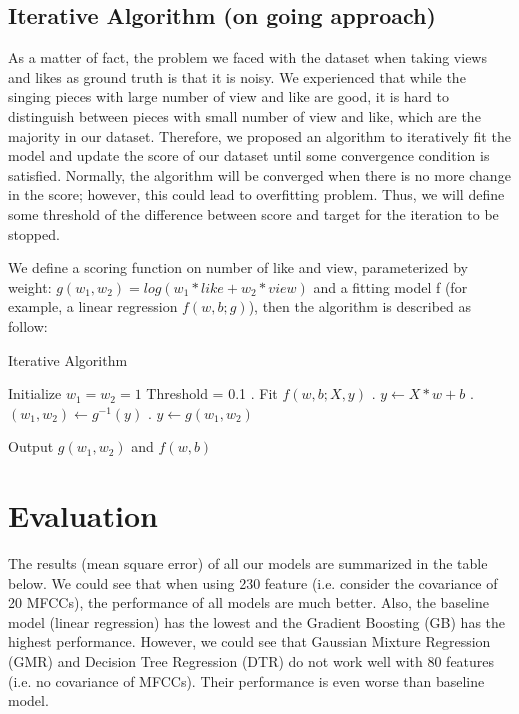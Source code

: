 \documentclass[paper=a4, fontsize=11pt, DIV=13]{scrartcl}
\begin{document}
\subsection{Iterative Algorithm (on going approach)}
As a matter of fact, the problem we faced with the dataset when taking views and likes as ground truth is that it is noisy. We experienced that while the singing pieces with large number of view and like are good, it is hard to distinguish between pieces with small number of view and like, which are the majority in our dataset. Therefore, we proposed an algorithm to iteratively fit the model and update the score of our dataset until some convergence condition is satisfied.  Normally, the algorithm will be converged when there is no more change in the score; however, this could lead to overfitting problem. Thus, we will define some threshold of the difference between score and target for the iteration to be stopped.

We define a scoring function on number of like and view, parameterized by weight: 
$g(w_1, w_2) = log(w_1*like + w_2*view)$ and a fitting model f (for example, a linear regression $f(w,b; g)$), then the algorithm is described as follow:

\begin{algorithm}
\caption{Iterative Algorithm}
\begin{algorithmic} 

\STATE Initialize $w_1 = w_2 =1$
\STATE Threshold = 0.1 
. Fit $f(w,b; X,y)$
. $y \gets X*w + b$
. $(w_1,w_2) \gets g^{-1}(y)$
. $y \gets g(w_1, w_2)$
\ENDWHILE

\STATE Output $g(w_1, w_2)$ and $f(w,b)$

\end{algorithmic}
\end{algorithm}

\section{Evaluation}
The results (mean square error) of all our models are summarized in the table below. We could see that when using 230 feature (i.e. consider the covariance of 20 MFCCs), the performance of all models are much better. Also, the baseline model (linear regression) has the lowest and the Gradient Boosting (GB) has the highest performance. However, we could see that Gaussian Mixture Regression (GMR) and Decision Tree Regression (DTR) do not work well with 80 features (i.e. no covariance of MFCCs). Their performance is even worse than baseline model.
\end{document}

